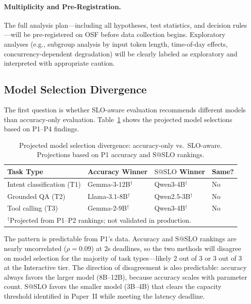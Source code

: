 \documentclass[11pt]{article}
\makeatletter
\newcommand{\sslo}{\ensuremath{\mathrm{S@SLO}}}
\makeatother
\begin{document}
\paragraph{Multiplicity and Pre-Registration.} The full analysis plan---including all hypotheses, test statistics, and decision rules---will be pre-registered on OSF before data collection begins. Exploratory analyses (e.g., subgroup analysis by input token length, time-of-day effects, concurrency-dependent degradation) will be clearly labeled as exploratory and interpreted with appropriate caution.

\subsection{Model Selection Divergence}

The first question is whether SLO-aware evaluation recommends different models than accuracy-only evaluation. Table~\ref{tab:selection-divergence} shows the projected model selections based on P1--P4 findings.

\begin{table}[t]
\centering
\caption{Projected model selection divergence: accuracy-only vs.\ SLO-aware. Projections based on P1 accuracy and $\sslo{}$ rankings.}
\label{tab:selection-divergence}
\small
\begin{tabular}{llll}
\toprule
\textbf{Task Type} & \textbf{Accuracy Winner} & \textbf{$\sslo{}$ Winner} & \textbf{Same?} \\
\midrule
Intent classification (T1) & Gemma-3-12B$^\dagger$ & Qwen3-4B$^\dagger$ & No \\
Grounded QA (T2) & Llama-3.1-8B$^\dagger$ & Qwen2.5-3B$^\dagger$ & No \\
Tool calling (T3) & Gemma-2-9B$^\dagger$ & Qwen3-4B$^\dagger$ & No \\
\bottomrule
\multicolumn{4}{l}{\footnotesize $^\dagger$Projected from P1--P2 rankings; not validated in production.}
\end{tabular}
\end{table}

The pattern is predictable from P1's data. Accuracy and $\sslo{}$ rankings are nearly uncorrelated ($\rho = 0.09$) at 2s deadlines, so the two methods will disagree on model selection for the majority of task types---likely 2 out of 3 or 3 out of 3 at the Interactive tier. The direction of disagreement is also predictable: accuracy always favors the larger model (8B--12B), because accuracy scales with parameter count. $\sslo{}$ favors the smaller model (3B--4B) that clears the capacity threshold identified in Paper~II while meeting the latency deadline.
\end{document}

